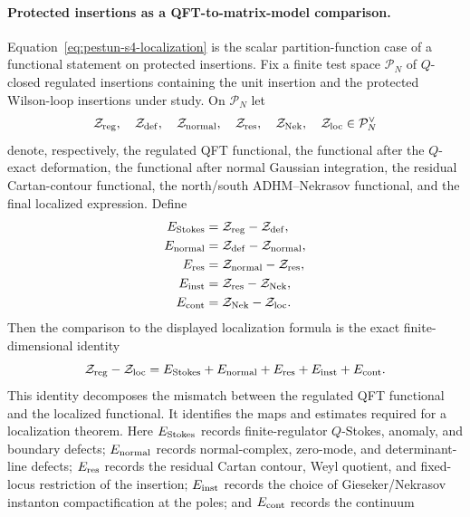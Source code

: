 \paragraph{Protected insertions as a QFT-to-matrix-model comparison.}
Equation~\eqref{eq:pestun-s4-localization} is the scalar partition-function
case of a functional statement on protected insertions.  Fix a finite
test space \(\mathcal P_N\) of \(Q\)-closed regulated insertions containing
the unit insertion and the protected Wilson-loop insertions under study.
On \(\mathcal P_N\) let
\[
  \mathcal Z_{\rm reg},\quad
  \mathcal Z_{\rm def},\quad
  \mathcal Z_{\rm normal},\quad
  \mathcal Z_{\rm res},\quad
  \mathcal Z_{\rm Nek},\quad
  \mathcal Z_{\rm loc}
  \in \mathcal P_N^\vee
\]
denote, respectively, the regulated QFT functional, the functional after
the \(Q\)-exact deformation, the functional after normal Gaussian
integration, the residual Cartan-contour functional, the north/south
ADHM--Nekrasov functional, and the final localized expression.  Define
\[
\begin{aligned}
  E_{\rm Stokes} &= \mathcal Z_{\rm reg}-\mathcal Z_{\rm def},\\
  E_{\rm normal} &= \mathcal Z_{\rm def}-\mathcal Z_{\rm normal},\\
  E_{\rm res} &= \mathcal Z_{\rm normal}-\mathcal Z_{\rm res},\\
  E_{\rm inst} &= \mathcal Z_{\rm res}-\mathcal Z_{\rm Nek},\\
  E_{\rm cont} &= \mathcal Z_{\rm Nek}-\mathcal Z_{\rm loc}.
\end{aligned}
\]
Then the comparison to the displayed localization formula is the exact
finite-dimensional identity
\begin{equation}
  \mathcal Z_{\rm reg}-\mathcal Z_{\rm loc}
  =
  E_{\rm Stokes}+E_{\rm normal}+E_{\rm res}+E_{\rm inst}+E_{\rm cont}.
  \label{eq:s4-protected-insertion-localization-budget}
\end{equation}
This identity decomposes the mismatch between the regulated QFT functional
and the localized functional.  It identifies the maps and estimates required
for a localization theorem.  Here \(E_{\rm Stokes}\) records
finite-regulator \(Q\)-Stokes, anomaly, and
boundary defects; \(E_{\rm normal}\) records normal-complex, zero-mode, and
determinant-line defects; \(E_{\rm res}\) records the residual Cartan
contour, Weyl quotient, and fixed-locus restriction of the insertion;
\(E_{\rm inst}\) records the choice of Gieseker/Nekrasov instanton
compactification at the poles; and \(E_{\rm cont}\) records the continuum
